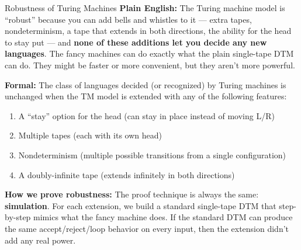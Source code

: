 \begin{definitionbox}{Robustness of Turing Machines}
\textbf{Plain English:}
The Turing machine model is ``robust'' because you can add bells and whistles
to it --- extra tapes, nondeterminism, a tape that extends in both directions,
the ability for the head to stay put --- and \textbf{none of these additions
let you decide any new languages}. The fancy machines can do exactly what the
plain single-tape DTM can do. They might be faster or more convenient, but they
aren't more powerful.

\textbf{Formal:}
The class of languages decided (or recognized) by Turing machines is unchanged
when the TM model is extended with any of the following features:
\begin{enumerate}[nosep]
\item A ``stay'' option for the head (can stay in place instead of moving L/R)
\item Multiple tapes (each with its own head)
\item Nondeterminism (multiple possible transitions from a single configuration)
\item A doubly-infinite tape (extends infinitely in both directions)
\end{enumerate}

\textbf{How we prove robustness:}
The proof technique is always the same: \textbf{simulation}. For each
extension, we build a standard single-tape DTM that step-by-step mimics what
the fancy machine does. If the standard DTM can produce the same
accept/reject/loop behavior on every input, then the extension didn't add any
real power.
\end{definitionbox}

